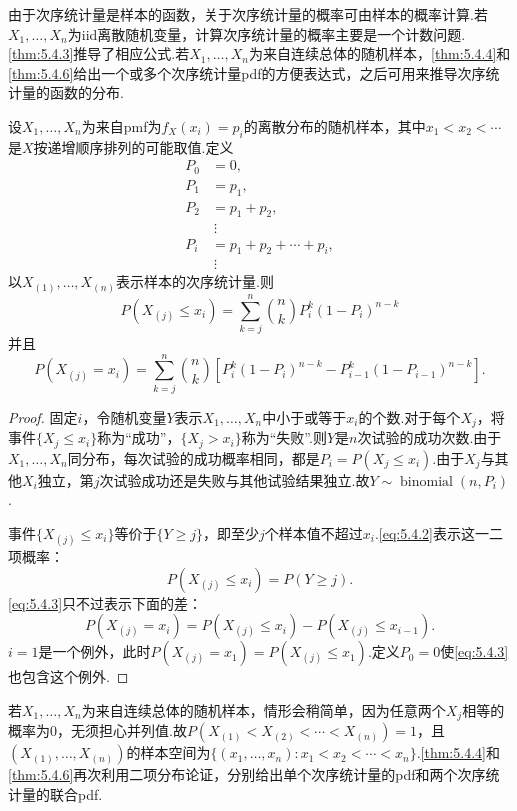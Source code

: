 由于次序统计量是样本的函数，关于次序统计量的概率可由样本的概率计算.若$X_1,\ldots,X_n$为iid离散随机变量，计算次序统计量的概率主要是一个计数问题.\autoref{thm:5.4.3}推导了相应公式.若$X_1,\ldots,X_n$为来自连续总体的随机样本，\autoref{thm:5.4.4}和\autoref{thm:5.4.6}给出一个或多个次序统计量pdf的方便表达式，之后可用来推导次序统计量的函数的分布.
\begin{theorem}\label{thm:5.4.3}
设$X_1,\ldots,X_n$为来自pmf为$f_X(x_i)=p_i$的离散分布的随机样本，其中$x_1<x_2<\cdots$是$X$按递增顺序排列的可能取值.定义
$$\begin{aligned}P_0&=0,\\P_1&=p_1,\\P_2&=p_1+p_2,\\&\ \vdots\\P_i&=p_1+p_2+\cdots+p_i,\\&\ \vdots\end{aligned}$$
以$X_{(1)},\ldots,X_{(n)}$表示样本的次序统计量.则
\begin{equation}\label{eq:5.4.2}
P(X_{(j)}\le x_i)=\sum_{k=j}^n\binom nk P_i^k(1-P_i)^{n-k}
\end{equation}
并且
\begin{equation}\label{eq:5.4.3}
P(X_{(j)}=x_i)=\sum_{k=j}^n\binom nk\left[P_i^k(1-P_i)^{n-k}-P_{i-1}^k(1-P_{i-1})^{n-k}\right].
\end{equation}
\end{theorem}
\begin{proof}
固定$i$，令随机变量$Y$表示$X_1,\ldots,X_n$中小于或等于$x_i$的个数.对于每个$X_j$，将事件$\{X_j\le x_i\}$称为“成功”，$\{X_j>x_i\}$称为“失败”.则$Y$是$n$次试验的成功次数.由于$X_1,\ldots,X_n$同分布，每次试验的成功概率相同，都是$P_i=P(X_j\le x_i)$.由于$X_j$与其他$X_i$独立，第$j$次试验成功还是失败与其他试验结果独立.故$Y\sim\operatorname{binomial}(n,P_i)$.

事件$\{X_{(j)}\le x_i\}$等价于$\{Y\ge j\}$，即至少$j$个样本值不超过$x_i$.\eqref{eq:5.4.2}表示这一二项概率：
$$P(X_{(j)}\le x_i)=P(Y\ge j).$$
\eqref{eq:5.4.3}只不过表示下面的差：
$$P(X_{(j)}=x_i)=P(X_{(j)}\le x_i)-P(X_{(j)}\le x_{i-1}).$$
$i=1$是一个例外，此时$P(X_{(j)}=x_1)=P(X_{(j)}\le x_1)$.定义$P_0=0$使\eqref{eq:5.4.3}也包含这个例外.
\end{proof}
若$X_1,\ldots,X_n$为来自连续总体的随机样本，情形会稍简单，因为任意两个$X_j$相等的概率为0，无须担心并列值.故$P(X_{(1)}<X_{(2)}<\cdots<X_{(n)})=1$，且$(X_{(1)},\ldots,X_{(n)})$的样本空间为$\{(x_1,\ldots,x_n):x_1<x_2<\cdots<x_n\}$.\autoref{thm:5.4.4}和\autoref{thm:5.4.6}再次利用二项分布论证，分别给出单个次序统计量的pdf和两个次序统计量的联合pdf.
